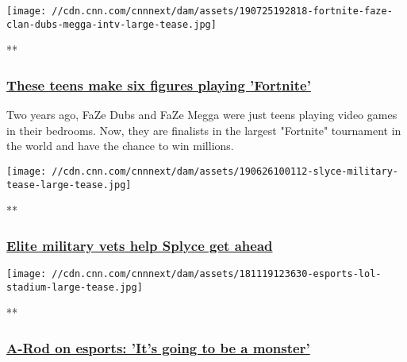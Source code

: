 \texttt{[image: //cdn.cnn.com/cnnnext/dam/assets/190725192818-fortnite-faze-clan-dubs-megga-intv-large-tease.jpg]}

**

\hypertarget{these-teens-make-six-figures-playing-fortnite}{%
\subsubsection{\texorpdfstring{\href{/videos/business/2019/07/25/fortnite-teens-faze-dubs-megga-world-cup-millions.cnn-business}{These
teens make six figures playing
'Fortnite'}}{These teens make six figures playing 'Fortnite'}}\label{these-teens-make-six-figures-playing-fortnite}}

Two years ago, FaZe Dubs and FaZe Megga were just teens playing video
games in their bedrooms. Now, they are finalists in the largest
"Fortnite" tournament in the world and have the chance to win millions.

\href{/videos/sports/2019/06/26/military-vets-special-operations-marines-splyce-call-of-duty-esports-lon-orig-spt-intl-gbr.cnn}{}

\texttt{[image: //cdn.cnn.com/cnnnext/dam/assets/190626100112-slyce-military-tease-large-tease.jpg]}

**

\hypertarget{elite-military-vets-help-splyce-get-ahead}{%
\subsubsection{\texorpdfstring{\href{/videos/sports/2019/06/26/military-vets-special-operations-marines-splyce-call-of-duty-esports-lon-orig-spt-intl-gbr.cnn}{Elite
military vets help Splyce get
ahead}}{Elite military vets help Splyce get ahead}}\label{elite-military-vets-help-splyce-get-ahead}}

\href{/videos/sports/2018/11/20/alex-rodriguez-esports-league-of-legends-riot-games-lec-announcement-spt-intl.cnn}{}

\texttt{[image: //cdn.cnn.com/cnnnext/dam/assets/181119123630-esports-lol-stadium-large-tease.jpg]}

**

\hypertarget{a-rod-on-esports-its-going-to-be-a-monster}{%
\subsubsection{\texorpdfstring{\href{/videos/sports/2018/11/20/alex-rodriguez-esports-league-of-legends-riot-games-lec-announcement-spt-intl.cnn}{A-Rod
on esports: 'It's going to be a
monster'}}{A-Rod on esports: 'It's going to be a monster'}}\label{a-rod-on-esports-its-going-to-be-a-monster}}

